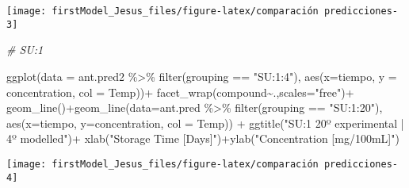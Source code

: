 \documentclass[
]{article}
\newenvironment{Shaded}{\begin{snugshade}}{\end{snugshade}}
\newcommand{\AttributeTok}[1]{\textcolor[rgb]{0.77,0.63,0.00}{#1}}
\newcommand{\CommentTok}[1]{\textcolor[rgb]{0.56,0.35,0.01}{\textit{#1}}}
\newcommand{\FunctionTok}[1]{\textcolor[rgb]{0.00,0.00,0.00}{#1}}
\newcommand{\NormalTok}[1]{#1}
\newcommand{\SpecialCharTok}[1]{\textcolor[rgb]{0.00,0.00,0.00}{#1}}
\newcommand{\StringTok}[1]{\textcolor[rgb]{0.31,0.60,0.02}{#1}}
\begin{document}
\begin{center}\texttt{[image: firstModel\_Jesus\_files/figure-latex/comparación predicciones-3]} \end{center}

\begin{Shaded}
\begin{Highlighting}[]
\CommentTok{\# SU:1}

\FunctionTok{ggplot}\NormalTok{(}\AttributeTok{data =}\NormalTok{ ant.pred2 }\SpecialCharTok{\%\textgreater{}\%} \FunctionTok{filter}\NormalTok{(grouping }\SpecialCharTok{==} \StringTok{"SU:1:4"}\NormalTok{), }\FunctionTok{aes}\NormalTok{(}\AttributeTok{x=}\NormalTok{tiempo, }\AttributeTok{y =}\NormalTok{ concentration, }\AttributeTok{col =}\NormalTok{ Temp))}\SpecialCharTok{+}
  \FunctionTok{facet\_wrap}\NormalTok{(compound}\SpecialCharTok{\textasciitilde{}}\NormalTok{.,}\AttributeTok{scales=}\StringTok{"free"}\NormalTok{)}\SpecialCharTok{+}
  \FunctionTok{geom\_line}\NormalTok{()}\SpecialCharTok{+}\FunctionTok{geom\_line}\NormalTok{(}\AttributeTok{data=}\NormalTok{ant.pred }\SpecialCharTok{\%\textgreater{}\%} \FunctionTok{filter}\NormalTok{(grouping }\SpecialCharTok{==} \StringTok{"SU:1:20"}\NormalTok{), }\FunctionTok{aes}\NormalTok{(}\AttributeTok{x=}\NormalTok{tiempo, }\AttributeTok{y=}\NormalTok{concentration, }\AttributeTok{col =}\NormalTok{ Temp)) }\SpecialCharTok{+}
  \FunctionTok{ggtitle}\NormalTok{(}\StringTok{"SU:1 20º experimental | 4º modelled"}\NormalTok{)}\SpecialCharTok{+} \FunctionTok{xlab}\NormalTok{(}\StringTok{"Storage Time [Days]"}\NormalTok{)}\SpecialCharTok{+}\FunctionTok{ylab}\NormalTok{(}\StringTok{"Concentration [mg/100mL]"}\NormalTok{)}
\end{Highlighting}
\end{Shaded}

\begin{center}\texttt{[image: firstModel\_Jesus\_files/figure-latex/comparación predicciones-4]} \end{center}
\end{document}
